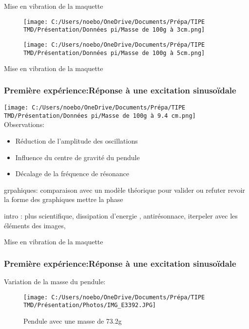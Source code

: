 \documentclass{beamer}
\begin{document}
	
	
	\begin{frame}{Mise en vibration de la maquette}

		
		\begin{figure}
		\centering
		\texttt{[image: C:/Users/noebo/OneDrive/Documents/Prépa/TIPE TMD/Présentation/Données pi/Masse de 100g à 3cm.png]}
		
		
		\centering
		\texttt{[image: C:/Users/noebo/OneDrive/Documents/Prépa/TIPE TMD/Présentation/Données pi/Masse de 100g à 5cm.png]}
		\end{figure}
	\end{frame}
	
	\begin{frame}{Mise en vibration de la maquette}
		\frametitle{Première expérience:Réponse à une excitation sinusoïdale}
		\centering
		\texttt{[image: C:/Users/noebo/OneDrive/Documents/Prépa/TIPE TMD/Présentation/Données pi/Masse de 100g à 9.4 cm.png]}
		\\
		\vspace{12pt}
		Observations:
		\begin{itemize}
			\item Réduction de l'amplitude des oscillations
			\item Influence du centre de gravité du pendule
			\item Décalage de la fréquence de résonance  
		\end{itemize}
		
	\end{frame}
	
	\begin{frame}{}
		grpahiques: comparaison avec un modèle théorique pour valider ou refuter 
		revoir la forme des graphiques 
		mettre la phase
	\end{frame}
	\begin{frame}{}
		intro : plus scientifique, dissipation d'energie , antirésonnace, iterpeler avec les éléments des images,
	\end{frame}
	
	\begin{frame}{Mise en vibration de la maquette}
		\frametitle{Première expérience:Réponse à une excitation sinusoïdale}
		Variation de la masse du pendule:
		\begin{figure}
			\texttt{[image: C:/Users/noebo/OneDrive/Documents/Prépa/TIPE TMD/Présentation/Photos/IMG\_E3392.JPG]}
			\caption{Pendule avec une masse de 73.2g}
		\end{figure}
	\end{frame}
	
\end{document}

